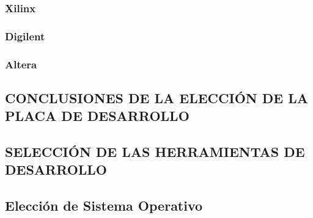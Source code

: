 				\subsubsection{Xilinx}
				\subsubsection{Digilent} 	 
				\subsubsection{Altera}
 			\subsection{CONCLUSIONES DE LA ELECCIÓN DE LA PLACA DE
 		DESARROLLO}
 			\subsection{SELECCIÓN DE LAS HERRAMIENTAS DE DESARROLLO} 	 
 			\subsection{Elección de Sistema Operativo}
 			